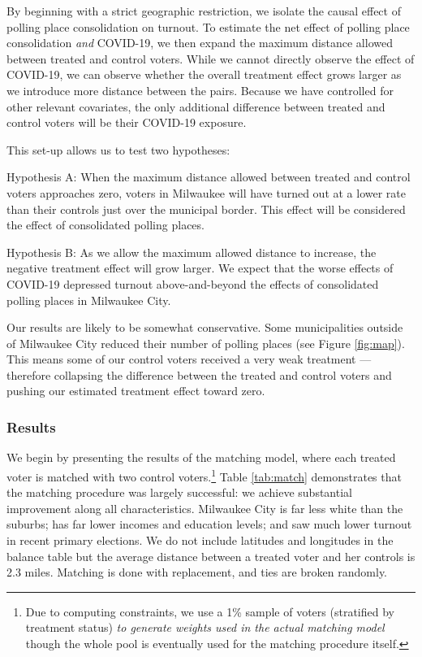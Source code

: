 \documentclass[
  12pt,
]{article}
\begin{document}
By beginning with a strict geographic restriction, we isolate the causal effect of polling place consolidation on turnout. To estimate the net effect of polling place consolidation \emph{and} COVID-19, we then expand the maximum distance allowed between treated and control voters. While we cannot directly observe the effect of COVID-19, we can observe whether the overall treatment effect grows larger as we introduce more distance between the pairs. Because we have controlled for other relevant covariates, the only additional difference between treated and control voters will be their COVID-19 exposure.

This set-up allows us to test two hypotheses:

Hypothesis A: When the maximum distance allowed between treated and control voters approaches zero, voters in Milwaukee will have turned out at a lower rate than their controls just over the municipal border. This effect will be considered the effect of consolidated polling places.

Hypothesis B: As we allow the maximum allowed distance to increase, the negative treatment effect will grow larger. We expect that the worse effects of COVID-19 depressed turnout above-and-beyond the effects of consolidated polling places in Milwaukee City.

Our results are likely to be somewhat conservative. Some municipalities outside of Milwaukee City reduced their number of polling places (see Figure \ref{fig:map}). This means some of our control voters received a very weak treatment --- therefore collapsing the difference between the treated and control voters and pushing our estimated treatment effect toward zero.

\hypertarget{results}{%
\subsubsection*{Results}\label{results}}

We begin by presenting the results of the matching model, where each treated voter is matched with two control voters.\footnote{Due to computing constraints, we use a 1\% sample of voters (stratified by treatment status) \emph{to generate weights used in the actual matching model} though the whole pool is eventually used for the matching procedure itself.} Table \ref{tab:match} demonstrates that the matching procedure was largely successful: we achieve substantial improvement along all characteristics. Milwaukee City is far less white than the suburbs; has far lower incomes and education levels; and saw much lower turnout in recent primary elections. We do not include latitudes and longitudes in the balance table but the average distance between a treated voter and her controls is 2.3 miles. Matching is done with replacement, and ties are broken randomly.
\end{document}
